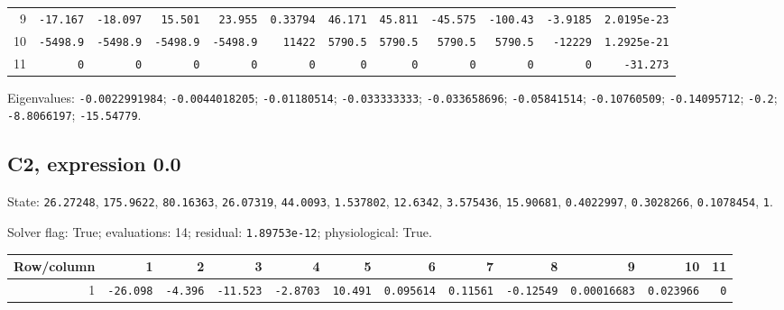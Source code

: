 \begin{landscape}
\begin{tabular}{rrrrrrrrrrrr}
9 & \texttt{-17.167} & \texttt{-18.097} & \texttt{15.501} & \texttt{23.955} & \texttt{0.33794} & \texttt{46.171} & \texttt{45.811} & \texttt{-45.575} & \texttt{-100.43} & \texttt{-3.9185} & \texttt{2.0195e-23} \\

10 & \texttt{-5498.9} & \texttt{-5498.9} & \texttt{-5498.9} & \texttt{-5498.9} & \texttt{11422} & \texttt{5790.5} & \texttt{5790.5} & \texttt{5790.5} & \texttt{5790.5} & \texttt{-12229} & \texttt{1.2925e-21} \\

11 & \texttt{0} & \texttt{0} & \texttt{0} & \texttt{0} & \texttt{0} & \texttt{0} & \texttt{0} & \texttt{0} & \texttt{0} & \texttt{0} & \texttt{-31.273} \\

\bottomrule\end{tabular}\par\endgroup

{\scriptsize Eigenvalues: \texttt{-0.0022991984}; \texttt{-0.0044018205}; \texttt{-0.01180514}; \texttt{-0.033333333}; \texttt{-0.033658696}; \texttt{-0.05841514}; \texttt{-0.10760509}; \texttt{-0.14095712}; \texttt{-0.2}; \texttt{-8.8066197}; \texttt{-15.54779}.\par}

\subsection*{C2, expression 0.0}
{\scriptsize State: \texttt{26.27248}, \texttt{175.9622}, \texttt{80.16363}, \texttt{26.07319}, \texttt{44.0093}, \texttt{1.537802}, \texttt{12.6342}, \texttt{3.575436}, \texttt{15.90681}, \texttt{0.4022997}, \texttt{0.3028266}, \texttt{0.1078454}, \texttt{1}.\par

Solver flag: True; evaluations: 14; residual: \texttt{1.89753e-12}; physiological: True.\par}

\begingroup\scriptsize\setlength{\tabcolsep}{3pt}\centering
\begin{tabular}{rrrrrrrrrrrr}\toprule

Row/column & 1 & 2 & 3 & 4 & 5 & 6 & 7 & 8 & 9 & 10 & 11 \\ \midrule

1 & \texttt{-26.098} & \texttt{-4.396} & \texttt{-11.523} & \texttt{-2.8703} & \texttt{10.491} & \texttt{0.095614} & \texttt{0.11561} & \texttt{-0.12549} & \texttt{0.00016683} & \texttt{0.023966} & \texttt{0} \\


\end{tabular}
\end{landscape}
